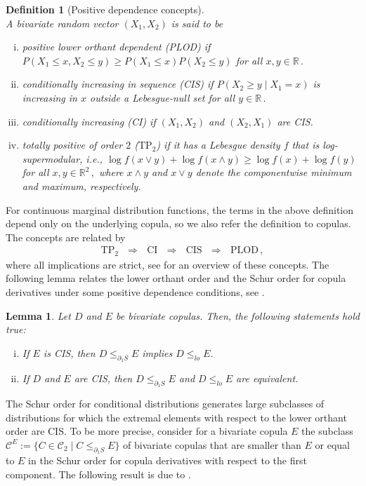 \documentclass{article}
\newtheorem{lemma}[theorem]{Lemma}
\newtheorem{definition}[theorem]{Definition}
\newcommand{\R}{\mathbb{R}}
\newcommand{\cC}{\mathcal{C}}
\newcommand{\TP}{\mathrm{TP_2}}
\begin{document}
\begin{definition}[Positive dependence concepts]\label{defposdep}~\\
    A bivariate random vector \((X_1,X_2)\) is said to be
    \begin{enumerate}[(i)]
        \item \emph{positive lower orthant dependent} (PLOD) if \(P(X_1\leq x, X_2\leq y) \geq P(X_1\leq x) P(X_2\leq y)\) for all \(x,y\in \R\,.\)
        \item \label{defposdep2} \emph{conditionally increasing in sequence} (CIS) if \(P(X_2\geq y\mid X_1 =x)\) is increasing in \(x\) outside a Lebesgue-null set for all \(y\in \R\,.\)
        \item \label{defposdep3} \emph{conditionally increasing} (CI) if \((X_1,X_2)\) and \((X_2,X_1)\) are CIS.
        \item \emph{totally positive of order \(2\)} (\(\TP\)) if it has a Lebesgue density \(f\) that is log-supermodular, i.e., \(\log f(x\vee y) + \log f(x\wedge y) \geq \log f(x)+ \log f(y)\) for all \(x,y\in \R^2\,,\) where \(x\wedge y\) and \(x\vee y\) denote the componentwise minimum and maximum, respectively.
    \end{enumerate}
\end{definition}

For continuous marginal distribution functions, the terms in the above definition depend only on the underlying copula, so we also refer the definition to copulas.
The concepts are related by
\begin{align}\label{implposdepcon}
	\TP ~~~\Longrightarrow ~~~ \text{CI} ~~~\Longrightarrow ~~~ \text{CIS} ~~~\Longrightarrow ~~~ \text{PLOD}\,,
\end{align}
where all implications are strict, see \cite[page 146]{Mueller-Stoyan-2002} for an overview of these concepts.
The following lemma relates the lower orthant order and the Schur order for copula derivatives under some positive dependence conditions, see \cite[Lemma 3.16]{Ansari-Rueschendorf-2021}.

\begin{lemma}\label{lem:3.16}
    Let $D$ and $E$ be bivariate copulas.
    Then, the following statements hold true: 
    \begin{enumerate}[(i)]
        \item If $E$ is CIS, then $D\leq_{\partial_1 S} E$ implies $D\leq_{lo} E$.
        \item If $D$ and $E$ are CIS, then $D\leq_{\partial_1 S} E$ and $D\leq_{lo}E$ are equivalent.
    \end{enumerate}
\end{lemma}
The Schur order for conditional distributions generates large subclasses of distributions for which the extremal elements with respect to the lower orthant order are CIS.
To be more precise, consider for a bivariate copula \(E\) the subclass \(\cC^E:=\{C\in \cC_2 \mid C\leq_{\partial_1 S} E\}\) of bivariate copulas that are smaller than \(E\) or equal to \(E\) in the Schur order for copula derivatives with respect to the first component.
The following result is due to \cite[Proposition 3.17]{Ansari-Rueschendorf-2021}.
\end{document}
